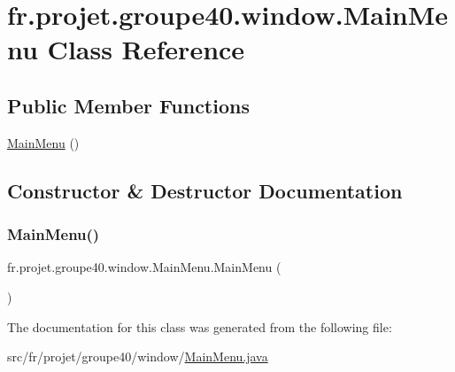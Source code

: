 \hypertarget{classfr_1_1projet_1_1groupe40_1_1window_1_1_main_menu}{}\section{fr.\+projet.\+groupe40.\+window.\+Main\+Menu Class Reference}
\label{classfr_1_1projet_1_1groupe40_1_1window_1_1_main_menu}
\subsection*{Public Member Functions}
\begin{DoxyCompactItemize}
\item 
\hyperlink{classfr_1_1projet_1_1groupe40_1_1window_1_1_main_menu_a7f6750d8762abddecd2b099019a03de4}{Main\+Menu} ()
\end{DoxyCompactItemize}


\subsection{Constructor \& Destructor Documentation}
\mbox{\label{classfr_1_1projet_1_1groupe40_1_1window_1_1_main_menu_a7f6750d8762abddecd2b099019a03de4}} 
\subsubsection{\texorpdfstring{Main\+Menu()}{MainMenu()}}
{\footnotesize\ttfamily fr.\+projet.\+groupe40.\+window.\+Main\+Menu.\+Main\+Menu (\begin{DoxyParamCaption}{ }\end{DoxyParamCaption})}



The documentation for this class was generated from the following file\+:\begin{DoxyCompactItemize}
\item 
src/fr/projet/groupe40/window/\hyperlink{_main_menu_8java}{Main\+Menu.\+java}\end{DoxyCompactItemize}
